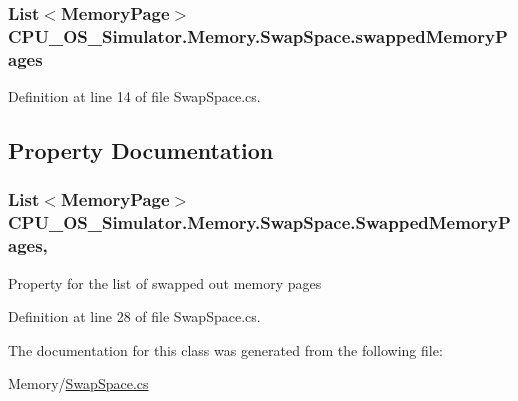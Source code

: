 \subsubsection[{swapped\+Memory\+Pages}]{\setlength{\rightskip}{0pt plus 5cm}List$<${\bf Memory\+Page}$>$ C\+P\+U\+\_\+\+O\+S\+\_\+\+Simulator.\+Memory.\+Swap\+Space.\+swapped\+Memory\+Pages\hspace{0.3cm}{\ttfamily [private]}}\label{class_c_p_u___o_s___simulator_1_1_memory_1_1_swap_space_ad991c315222ab7bf7fafd562d6fe8014}


Definition at line 14 of file Swap\+Space.\+cs.



\subsection{Property Documentation}
\hypertarget{class_c_p_u___o_s___simulator_1_1_memory_1_1_swap_space_a83c049a398bcff3c29f809b02ed3f782}{}
\subsubsection[{Swapped\+Memory\+Pages}]{\setlength{\rightskip}{0pt plus 5cm}List$<${\bf Memory\+Page}$>$ C\+P\+U\+\_\+\+O\+S\+\_\+\+Simulator.\+Memory.\+Swap\+Space.\+Swapped\+Memory\+Pages\hspace{0.3cm}{\ttfamily [get]}, {\ttfamily [set]}}\label{class_c_p_u___o_s___simulator_1_1_memory_1_1_swap_space_a83c049a398bcff3c29f809b02ed3f782}


Property for the list of swapped out memory pages 



Definition at line 28 of file Swap\+Space.\+cs.



The documentation for this class was generated from the following file\+:\begin{DoxyCompactItemize}
\item 
Memory/\hyperlink{_swap_space_8cs}{Swap\+Space.\+cs}\end{DoxyCompactItemize}
